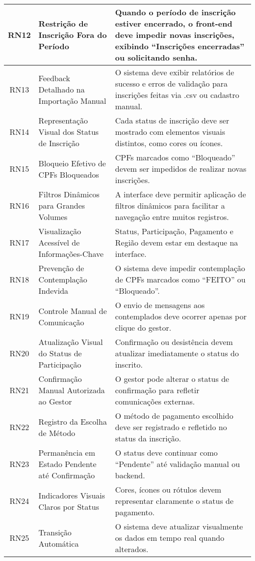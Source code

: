 \begin{longtable}{|c|>{\raggedright\arraybackslash}p{6cm}|>{\raggedright\arraybackslash}p{8cm}|}
\hline
RN12 & Restrição de Inscrição Fora do Período & Quando o período de inscrição estiver encerrado, o front-end deve impedir novas inscrições, exibindo “Inscrições encerradas” ou solicitando senha. \\
\hline
RN13 & Feedback Detalhado na Importação Manual & O sistema deve exibir relatórios de sucesso e erros de validação para inscrições feitas via .csv ou cadastro manual. \\
\hline
RN14 & Representação Visual dos Status de Inscrição & Cada status de inscrição deve ser mostrado com elementos visuais distintos, como cores ou ícones. \\
\hline
RN15 & Bloqueio Efetivo de CPFs Bloqueados & CPFs marcados como “Bloqueado” devem ser impedidos de realizar novas inscrições. \\
\hline
RN16 & Filtros Dinâmicos para Grandes Volumes & A interface deve permitir aplicação de filtros dinâmicos para facilitar a navegação entre muitos registros. \\
\hline
RN17 & Visualização Acessível de Informações-Chave & Status, Participação, Pagamento e Região devem estar em destaque na interface. \\
\hline
RN18 & Prevenção de Contemplação Indevida & O sistema deve impedir contemplação de CPFs marcados como “FEITO” ou “Bloqueado”. \\
\hline
RN19 & Controle Manual de Comunicação & O envio de mensagens aos contemplados deve ocorrer apenas por clique do gestor. \\
\hline
RN20 & Atualização Visual do Status de Participação & Confirmação ou desistência devem atualizar imediatamente o status do inscrito. \\
\hline
RN21 & Confirmação Manual Autorizada ao Gestor & O gestor pode alterar o status de confirmação para refletir comunicações externas. \\
\hline
RN22 & Registro da Escolha de Método & O método de pagamento escolhido deve ser registrado e refletido no status da inscrição. \\
\hline
RN23 & Permanência em Estado Pendente até Confirmação & O status deve continuar como “Pendente” até validação manual ou backend. \\
\hline
RN24 & Indicadores Visuais Claros por Status & Cores, ícones ou rótulos devem representar claramente o status de pagamento. \\
\hline
RN25 & Transição Automática & O sistema deve atualizar visualmente os dados em tempo real quando alterados. \\

\end{longtable}
